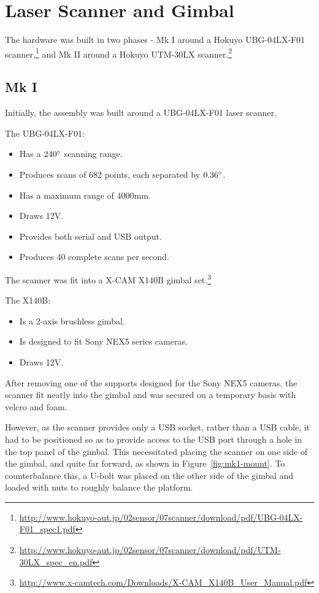 \documentclass[12pt,oneside,a4paper]{book}
\begin{document}
\section{Laser Scanner and Gimbal}
\label{sec:laser-scanner-gimbal}

The hardware was built in two phases - Mk I around a Hokuyo
UBG-04LX-F01
scanner,\footnote{\url{http://www.hokuyo-aut.jp/02sensor/07scanner/download/pdf/UBG-04LX-F01_spec1.pdf}}
and Mk II around a Hokuyo UTM-30LX scanner.\footnote{\url{http://www.hokuyo-aut.jp/02sensor/07scanner/download/pdf/UTM-30LX_spec_en.pdf}}


\subsection{Mk I}
\label{sec:mk-i}

Initially, the assembly was built around a UBG-04LX-F01 laser
scanner.

The UBG-04LX-F01:
\begin{itemize}
\item Has a $240\degree$ scanning range.
\item Produces scans of 682 points, each separated by $0.36\degree$.
\item Has a maximum range of 4000mm.
\item Draws 12V.
\item Provides both serial and USB output.
\item Produces 40 complete scans per second.
\end{itemize}

The scanner was fit into a X-CAM X140B gimbal set.\footnote{\url{http://www.x-camtech.com/Downloads/X-CAM_X140B_User_Manual.pdf}}

The X140B:
\begin{itemize}
\item Is a 2-axis brushless gimbal.
\item Is designed to fit Sony NEX5 series cameras.
\item Draws 12V.
\end{itemize}

After removing one of the supports designed for the Sony NEX5 cameras,
the scanner fit neatly into the gimbal and was secured on a temporary
basis with velcro and foam.

However, as the scanner provides only a USB socket, rather than a USB
cable, it had to be positioned so as to provide access to the USB port
through a hole in the top panel of the gimbal. This necessitated
placing the scanner on one side of the gimbal, and quite far forward,
as shown in Figure~\ref{fig:mk1-mount}. To counterbalance this, a
U-bolt was placed on the other side of the gimbal and loaded with nuts
to roughly balance the platform.
\end{document}
